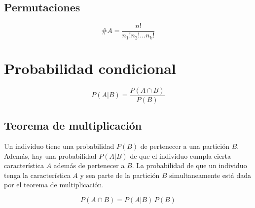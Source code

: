 \subsection{Permutaciones}

\begin{mdframed}[style=DefinitionFrame]
    \begin{defn}
    \end{defn}
    \begin{equation*}
        \#A = \frac{n!}{n_1!n_2! \dots n_k!}
    \end{equation*}
\end{mdframed}


\section{Probabilidad condicional}

\begin{mdframed}[style=DefinitionFrame]
    \begin{defn}
    \end{defn}
    \begin{equation*}
        P(A|B) = \frac{P(A \cap B)}{P(B)}
    \end{equation*}
\end{mdframed}


\subsection{Teorema de multiplicación}

Un individuo tiene una probabilidad $P(B)$ de pertenecer a una partición $B$.
Además, hay una probabilidad $P(A|B)$ de que el individuo cumpla cierta característica $A$ además de pertenecer a $B$.
La probabilidad de que un individuo tenga la característica $A$ y sea parte de la partición $B$ simultaneamente está dada por el teorema de multiplicación.

\begin{mdframed}[style=PropertyFrame]
    \begin{prop}
    \end{prop}
    \begin{equation*}
        P(A \cap B) = P(A|B) \, P(B)
    \end{equation*}
\end{mdframed}


